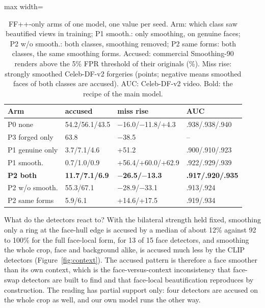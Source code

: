 \documentclass[conference,a4paper]{IEEEtran}
\begin{document}
\begin{table}[!tb]
\centering
\caption{FF++-only arms of one model, one value per seed. Arm: which class saw beautified views in training; P1 smooth.: only
smoothing, on genuine faces; P2 w/o smooth.: both classes, smoothing removed; P2 same forms: both classes, the same smoothing
forms. Accused: commercial Smoothing-90 renders above the 5\% FPR threshold of their originals (\%). Miss rise: strongly
smoothed Celeb-DF-v2 forgeries (points; negative means smoothed faces of both classes are accused). AUC: Celeb-DF-v2 video.
Bold: the recipe of the main model.}
\label{tab:exposure}
\footnotesize
\setlength{\tabcolsep}{3pt}
\begin{adjustbox}{max width=\columnwidth}
\begin{tabular}{@{}llll@{}}
\toprule
Arm & accused & miss rise & AUC \\
\midrule
P0 none & 54.2/56.1/43.5 & $-$16.0/$-$11.8/+4.3 & .938/.938/.940 \\
P3 forged only & 63.8 & $-$38.5 & -- \\
P1 genuine only & 3.7/7.1/4.6 & +51.2 & .900/.910/.923 \\
P1 smooth. & 0.7/1.0/0.9 & +56.4/+60.0/+62.9 & .922/.929/.939 \\
\textbf{P2 both} & \textbf{11.7/7.1/6.9} & \textbf{$-$26.5/$-$13.3} & \textbf{.917/.920/.935} \\
P2 w/o smooth. & 55.3/67.1 & $-$28.9/$-$33.1 & .913/.924 \\
P2 same forms & 5.9/6.1 & +14.6/+17.5 & .919/.934 \\
\bottomrule
\end{tabular}
\end{adjustbox}
\end{table}

What do the detectors react to? With the bilateral strength held fixed, smoothing only a ring at the face-hull edge is accused
by a median of about 12\% against 92 to 100\% for the full face-local form, for 13 of 15 face detectors, and smoothing the
whole crop, face and background alike, is accused much less by the CLIP detectors (Figure~\ref{fig:context}). The accused
pattern is therefore a face smoother than its own context, which is the face-versus-context inconsistency that face-swap
detectors are built to find and that face-local beautification reproduces by construction. The reading has partial support
only: four detectors are accused on the whole crop as well, and our own model runs the other way.
\end{document}
